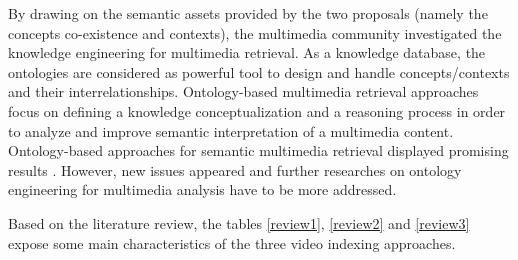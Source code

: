 		By drawing on the semantic assets provided by the two proposals 
		(namely the concepts co-existence and contexts), the multimedia 
		community investigated the knowledge engineering for multimedia retrieval. 
		As a  knowledge database, the ontologies are considered as powerful 
		tool to design and handle concepts/contexts and their interrelationships. 
		Ontology-based multimedia retrieval approaches focus on defining a knowledge 
		conceptualization and a reasoning process in order to analyze and improve 
		semantic interpretation of a multimedia content. Ontology-based approaches 
		for semantic multimedia retrieval displayed promising results \citep{Kannan2012}. 
		However, new issues appeared and further researches on ontology engineering for 
		multimedia analysis have to be more addressed.

		Based on the literature review, the tables \ref{review1}, \ref{review2} and \ref{review3} expose 
		some main characteristics of the three video indexing approaches.
